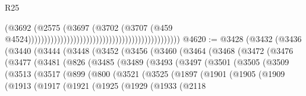 \begin{lexlean}{R25}
\begin{coremodule}
                                                                                      (@3692
                                                                                        (@2575
                                                                                          (@3697
                                                                                            (@3702
                                                                                              (@3707
                                                                                                (@459
                                                                                                  @4524)))))))))))))))))))))))))))))))))))))))))))))))
@4620 := @3428
    (@3432
      (@3436
        (@3440
          (@3444
            (@3448
              (@3452
                (@3456
                  (@3460
                    (@3464
                      (@3468
                        (@3472
                          (@3476
                            (@3477
                              (@3481
                                (@826
                                  (@3485
                                    (@3489
                                      (@3493
                                        (@3497
                                          (@3501
                                            (@3505
                                              (@3509
                                                (@3513
                                                  (@3517
                                                    (@899
                                                      (@800
                                                        (@3521
                                                          (@3525
                                                            (@1897
                                                              (@1901
                                                                (@1905
                                                                  (@1909
                                                                    (@1913
                                                                      (@1917
                                                                        (@1921
                                                                          (@1925
                                                                            (@1929
                                                                              (@1933
                                                                                (@2118

\end{coremodule}
\end{lexlean}
